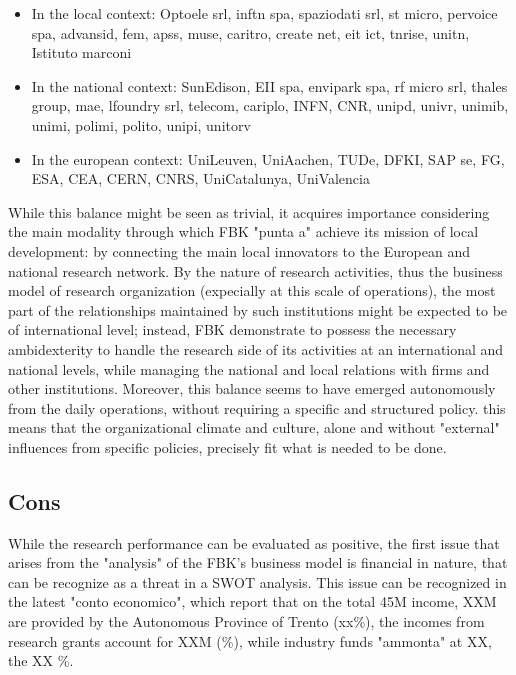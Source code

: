 \begin{itemize}

\item In the local context: Optoele srl, inftn spa, spaziodati srl, st micro, pervoice spa, advansid, fem, apss, muse, caritro, create net, eit ict, tnrise, unitn, Istituto marconi

\item In the national context: SunEdison, EII spa, envipark spa, rf micro srl, thales group, mae, lfoundry srl, telecom, cariplo, INFN, CNR, unipd, univr, unimib, unimi, polimi, polito, unipi, unitorv

\item In the european context: UniLeuven, UniAachen, TUDe, DFKI, SAP se, FG, ESA, CEA, CERN, CNRS, UniCatalunya, UniValencia

\end{itemize}

While this balance might be seen as trivial, it acquires importance considering the main modality through which FBK "punta a" achieve its mission of local development: by connecting the main local innovators to the European and national research network. By the nature of research activities, thus the business model of research organization (expecially at this scale of operations), the most part of the relationships maintained by such institutions might be expected to be of international level; instead, FBK demonstrate to possess the necessary ambidexterity to handle the research side of its activities at an international and national levels, while managing the national and local relations with firms and other institutions. Moreover, this balance seems to have emerged autonomously from the daily operations, without requiring a specific and structured policy. this means that the organizational climate and culture, alone and without "external" influences from specific policies, precisely fit what is needed to be done.  

\subsection{Cons}

While the research performance can be evaluated as positive, the first issue that arises from the "analysis" of the FBK's business model is financial in nature, that can be recognize as a threat in a SWOT analysis. This issue can be recognized in the latest "conto economico", which report that on the total 45M income, XXM are provided by the Autonomous Province of Trento (xx\%), the incomes from research grants account for XXM (\%), while industry funds "ammonta" at XX, the XX \%.


